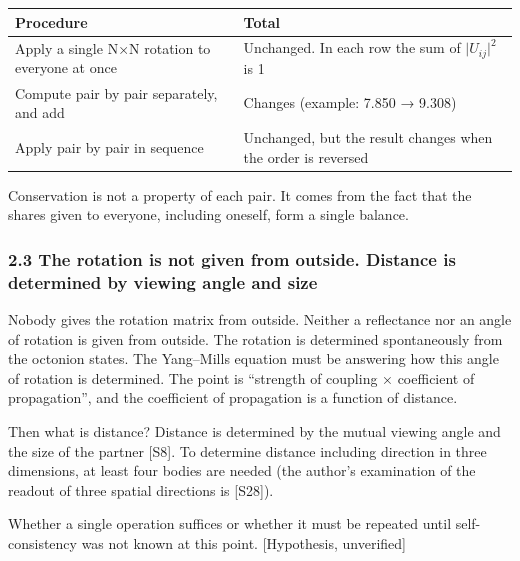 \documentclass[
  a4paper,
]{article}
\newcounter{none} %
\begin{document}
{\def\LTcaptype{none} %
\begin{longtable}[]{@{}
  >{\raggedright\arraybackslash}p{}
  >{\raggedright\arraybackslash}p{}@{}}
\toprule\noalign{}
\begin{minipage}[b]{\linewidth}\raggedright
Procedure
\end{minipage} & \begin{minipage}[b]{\linewidth}\raggedright
Total
\end{minipage} \\
\midrule\noalign{}
\endhead
\bottomrule\noalign{}
\endlastfoot
Apply a single N×N rotation to everyone at once & Unchanged. In each row
the sum of \(\lvert U_{ij}\rvert^2\) is 1 \\
Compute pair by pair separately, and add & Changes (example: 7.850 →
9.308) \\
Apply pair by pair in sequence & Unchanged, but the result changes when
the order is reversed \\
\end{longtable}
}

Conservation is not a property of each pair. It comes from the fact that
the shares given to everyone, including oneself, form a single balance.

\subsubsection{2.3 The rotation is not given from outside. Distance is
determined by viewing angle and
size}\label{the-rotation-is-not-given-from-outside.-distance-is-determined-by-viewing-angle-and-size}

Nobody gives the rotation matrix from outside. Neither a reflectance nor
an angle of rotation is given from outside. The rotation is determined
spontaneously from the octonion states. The Yang--Mills equation must be
answering how this angle of rotation is determined. The point is
``strength of coupling × coefficient of propagation'', and the
coefficient of propagation is a function of distance.

Then what is distance? Distance is determined by the mutual viewing
angle and the size of the partner {[}S8{]}. To determine distance
including direction in three dimensions, at least four bodies are needed
(the author's examination of the readout of three spatial directions is
{[}S28{]}).

Whether a single operation suffices or whether it must be repeated until
self-consistency was not known at this point. {[}Hypothesis,
unverified{]}
\end{document}

